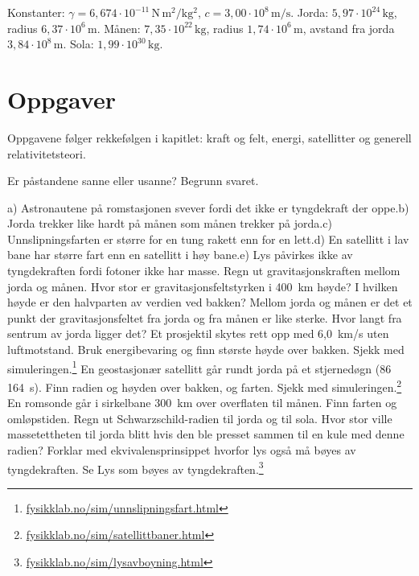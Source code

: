 \documentclass[11pt]{article}
\begin{document}
Konstanter: $γ = 6{,}674 \cdot 10^{-11}\,\mathrm{N\,m^{2}/kg^{2}}$, $c = 3{,}00 \cdot 10^{8}\,\mathrm{m/s}$. Jorda: $5{,}97 \cdot 10^{24}\,\mathrm{kg}$, radius $6{,}37 \cdot 10^{6}\,\mathrm{m}$. Månen: $7{,}35 \cdot 10^{22}\,\mathrm{kg}$, radius $1{,}74 \cdot 10^{6}\,\mathrm{m}$, avstand fra jorda $3{,}84 \cdot 10^{8}\,\mathrm{m}$. Sola: $1{,}99 \cdot 10^{30}\,\mathrm{kg}$.

\section*{Oppgaver}

Oppgavene følger rekkefølgen i kapitlet: kraft og felt, energi, satellitter og generell relativitetsteori.

\begin{oppgaveliste}
\oppgave {}Er påstandene sanne eller usanne? Begrunn svaret.

a) Astronautene på romstasjonen svever fordi det ikke er tyngdekraft der oppe.\newline b) Jorda trekker like hardt på månen som månen trekker på jorda.\newline c) Unnslipningsfarten er større for en tung rakett enn for en lett.\newline d) En satellitt i lav bane har større fart enn en satellitt i høy bane.\newline e) Lys påvirkes ikke av tyngdekraften fordi fotoner ikke har masse.
\svar
\oppgave {}Regn ut gravitasjonskraften mellom jorda og månen.
\svar
\oppgave {}Hvor stor er gravitasjonsfeltstyrken i 400~km høyde? I hvilken høyde er den halvparten av verdien ved bakken?
\svar
\oppgave {}Mellom jorda og månen er det et punkt der gravitasjonsfeltet fra jorda og fra månen er like sterke. Hvor langt fra sentrum av jorda ligger det?
\svar
\oppgave {}Et prosjektil skytes rett opp med 6,0~km/s uten luftmotstand. Bruk energibevaring og finn største høyde over bakken. Sjekk med simuleringen.\footnote{\url{fysikklab.no/sim/unnslipningsfart.html}}
\svar
\oppgave {}En geostasjonær satellitt går rundt jorda på et stjernedøgn (86 164~s). Finn radien og høyden over bakken, og farten. Sjekk med simuleringen.\footnote{\url{fysikklab.no/sim/satellittbaner.html}}
\svar
\oppgave {}En romsonde går i sirkelbane 300~km over overflaten til månen. Finn farten og omløpstiden.
\svar
\oppgave {}Regn ut Schwarzschild-radien til jorda og til sola. Hvor stor ville massetettheten til jorda blitt hvis den ble presset sammen til en kule med denne radien? Forklar med ekvivalensprinsippet hvorfor lys også må bøyes av tyngdekraften. Se Lys som bøyes av tyngdekraften.\footnote{\url{fysikklab.no/sim/lysavboyning.html}}
\svar
\end{oppgaveliste}
\end{document}
